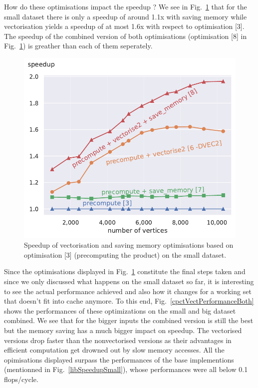 \documentclass[letterpaper]{article}
\begin{document}
How do these optimisations impact the speedup ?
We see in Fig.~\ref{cpctVectSpeedupSmall} that for the small dataset there is only a speedup of around 1.1x with saving memory while vectorisation yields a speedup of at most 1.6x with respect to optimisation [3].
The speedup of the combined version of both optimisations (optimisation [8] in Fig.~\ref{cpctVectSpeedupSmall}) is greather than each of them seperately.
\begin{figure}\centering
	\includegraphics[scale=0.59]{img/speedup[3][6][7][8]_small.pdf}
	\caption{Speedup of vectorisation and saving memory optimisations based on optimisation [3] (precomputing the product) on the small dataset. \label{cpctVectSpeedupSmall}}
\end{figure}
Since the optimisations displayed in Fig.~\ref{cpctVectSpeedupSmall} constitute the final steps taken and since we only discussed what happens on the small dataset so far, it is interesting to see the actual performance achieved and also how it changes for a working set that doesn't fit into cache anymore.
To this end, Fig.~\ref{cpctVectPerformanceBoth} shows the performances of these optimizations on the small and big dataset combined.
We see that for the bigger inputs the combined version is still the best but the memory saving has a much bigger impact on speedup.
The vectorised versions drop faster than the nonvectorised versions as their advantages in efficient computation get drowned out by slow memory accesses.
All the opimisations displayed surpass the performances of the base implementions (mentionned in Fig.~\ref{libSpeedupSmall}), whose performances were all below 0.1 flops/cycle.
\end{document}
